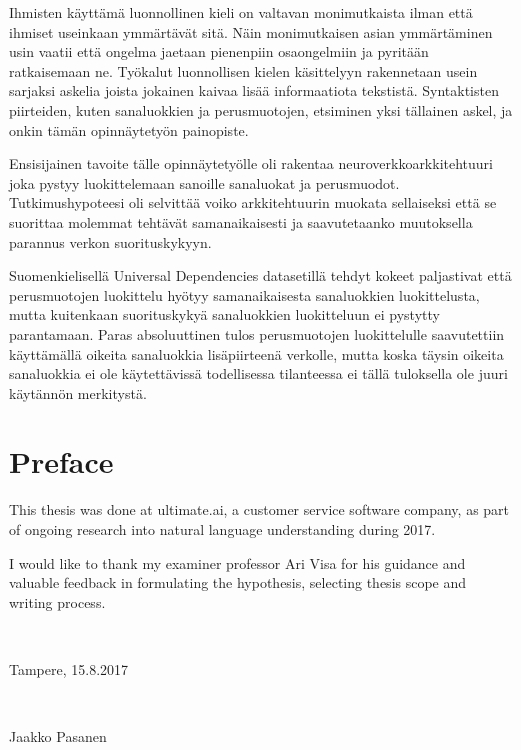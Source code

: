 \documentclass[12pt,a4paper,english
]{tutthesis}
\begin{document}
\begin{otherlanguage}{finnish}
Ihmisten käyttämä luonnollinen kieli on valtavan monimutkaista ilman että ihmiset useinkaan ymmärtävät sitä. Näin monimutkaisen asian ymmärtäminen usin vaatii että ongelma jaetaan pienenpiin osaongelmiin ja pyritään ratkaisemaan ne. Työkalut luonnollisen kielen käsittelyyn rakennetaan usein sarjaksi askelia joista jokainen kaivaa lisää informaatiota tekstistä. Syntaktisten piirteiden, kuten sanaluokkien ja perusmuotojen, etsiminen yksi tällainen askel, ja onkin tämän opinnäytetyön painopiste.

Ensisijainen tavoite tälle opinnäytetyölle oli rakentaa neuroverkkoarkkitehtuuri joka pystyy luokittelemaan sanoille sanaluokat ja perusmuodot. Tutkimushypoteesi oli selvittää voiko arkkitehtuurin muokata sellaiseksi että se suorittaa molemmat tehtävät samanaikaisesti ja saavutetaanko muutoksella parannus verkon suorituskykyyn.

Suomenkielisellä Universal Dependencies datasetillä tehdyt kokeet paljastivat että perusmuotojen luokittelu hyötyy samanaikaisesta sanaluokkien luokittelusta, mutta kuitenkaan suorituskykyä sanaluokkien luokitteluun ei pystytty parantamaan. Paras absoluuttinen tulos perusmuotojen luokittelulle saavutettiin käyttämällä oikeita sanaluokkia lisäpiirteenä verkolle, mutta koska täysin oikeita sanaluokkia ei ole käytettävissä todellisessa tilanteessa ei tällä tuloksella ole juuri käytännön merkitystä.



\end{otherlanguage} %


\chapter*{Preface}

This thesis was done at ultimate.ai, a customer service software company, as part of ongoing research into natural language understanding during 2017.

I would like to thank my examiner professor Ari Visa for his guidance and valuable feedback in formulating the hypothesis, selecting thesis scope and writing process.

~ 

Tampere, 15.8.2017

~

Jaakko Pasanen


\end{document}

